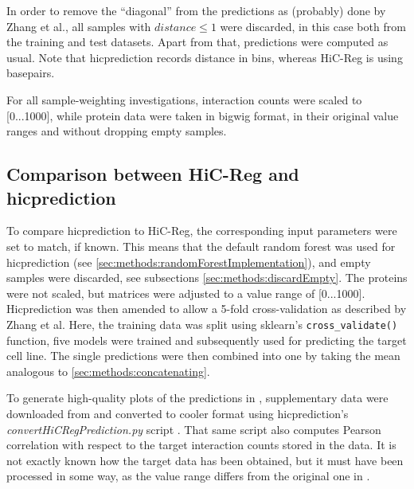 In order to remove the ``diagonal'' from the predictions as (probably) done by Zhang et al.,
all samples with $distance \leq 1$ were discarded, in this case both from the training and test datasets.
Apart from that, predictions were computed as usual.
Note that hicprediction records distance in bins, whereas HiC-Reg is using basepairs.

For all sample-weighting investigations, interaction counts were scaled to [0...1000], 
while protein data were taken in bigwig format, in their original value ranges and without dropping empty samples.

\subsection{Comparison between HiC-Reg and hicprediction}\label{sec:methods:comparison}
To compare hicprediction to HiC-Reg, the corresponding input parameters were set to match, if known.
This means that the default random forest was used for hicprediction (see \ref{sec:methods:randomForestImplementation}),
and empty samples were discarded, see subsections \ref{sec:methods:discardEmpty}.
The proteins were not scaled, but matrices were adjusted to a value range of [0...1000].
Hicprediction was then amended to allow a 5-fold cross-validation as described by Zhang et al. 
Here, the training data was split using sklearn's \texttt{cross\_validate()} function,
five models were trained and subsequently used for predicting the target cell line. 
The single predictions were then combined into one by taking the mean analogous to \autoref{sec:methods:concatenating}.

To generate high-quality plots of the predictions in \cite{Zhang2019}, supplementary data
were downloaded from \cite{zhangMaterial01,zhangMaterial02,zhangMaterial03} and converted to cooler format using hicprediction's 
\emph{convertHiCRegPrediction.py} script \cite{Krauth2020}. 
That same script also computes Pearson correlation with respect to the target interaction counts
stored in the data.
It is not exactly known how the target data has been obtained, 
but it must have been processed in some way, 
as the value range differs from the original one in \cite{Rao2014}.

